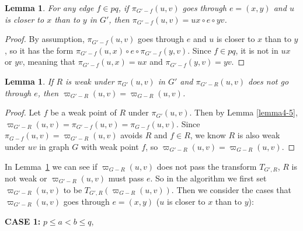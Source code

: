 \documentclass[11pt]{article}
\theoremstyle{plain}
\newtheorem{lemma}[theorem]{Lemma}
\theoremstyle{definition}
\newcommand{\og}[3]{\pi_{G-#3}\left(#1,#2\right)}
\newcommand{\nng}[3]{\pi_{G'-#3}\left(#1,#2\right)}
\newcommand{\odg}[3]{\varpi_{G-#3}\left(#1,#2\right)}
\newcommand{\ndg}[3]{\varpi_{G'-#3}\left(#1,#2\right)}
\newcommand{\pp}[1]{T_{G',R}\left(#1\right)}
\begin{document}
\begin{lemma}\label{lemma4-6}
    For any edge $f\in pq$, if $\nng{u}{v}{f}$ goes through $e=(x,y)$ and $u$ is closer to $x$ than to $y$ in $G'$, then $\nng{u}{v}{f}=ux\circ e \circ yv$.
\end{lemma}

\begin{proof}
    By assumption, $\nng{u}{v}{f}$ goes through $e$ and $u$ is closer to $x$ than to $y$, so it has the form $\nng{u}{x}{f}\circ e\circ \nng{y}{v}{f}.$ Since $f\in pq$, it is not in $ux$ or $yv$, meaning that $\nng{u}{x}{f}=ux$ and $\nng{y}{v}{f}=yv.$
\end{proof}

\begin{lemma}\label{thm:not-pass-e}
    If $R$ is weak under $\pi_{G'}(u,v)$ in $G'$ and $\nng{u}{v}{R}$ does not go through $e$, then $\ndg{u}{v}{R}=\odg{u}{v}{R}$.
\end{lemma}
\begin{proof}
  Let $f$ be a weak point of $R$ under $\pi_{G'}(u,v)$. Then by Lemma \ref{lemma4-5}, $\ndg{u}{v}{R}=\nng{u}{v}{f}=\og{u}{v}{f}.$ Since $\og{u}{v}{f}=\ndg{u}{v}{R}$ avoids $R$ and $f\in R$, we know $R$ is also weak under $uv$ in graph $G$ with weak point $f$, so $\ndg{u}{v}{R}=\odg{u}{v}{R}.$
\end{proof}

In Lemma~\ref{thm:not-pass-e} we can see if $\odg{u}{v}{R}$ does not pass the transform $T_{G',R}$, $R$ is not weak or $\ndg{u}{v}{R}$ must pass $e$. So in the algorithm we first set $\ndg{u}{v}{R}$ to be $\pp{\odg{u}{v}{R}}$. Then we consider the cases that $\ndg{u}{v}{R}$ goes through $e=(x,y)$ ($u$ is closer to $x$ than to $y$):

\vspace{5pt}




\noindent\textbf{CASE 1:} $p\le a<b\le q$,
\end{document}
